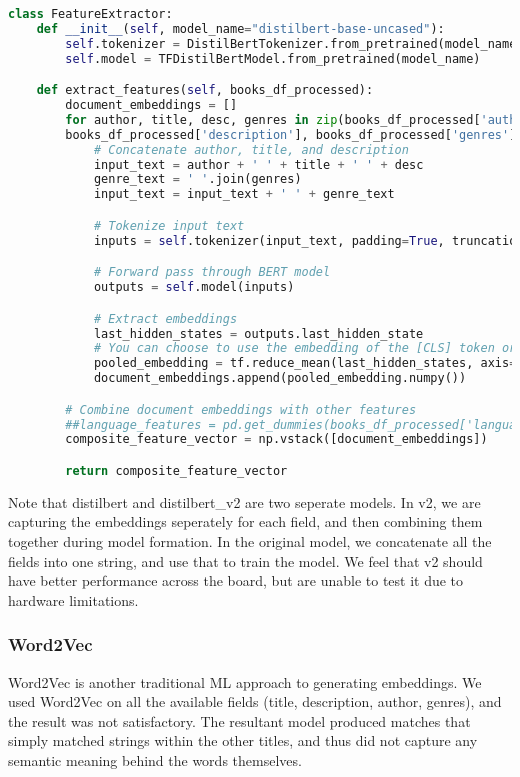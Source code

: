 \begin{lstlisting}[language=Python, caption={Feature Extraction using DistilBert}, label={lst:example}, linewidth=\linewidth, breaklines=true]
    class FeatureExtractor:
    def __init__(self, model_name="distilbert-base-uncased"):
        self.tokenizer = DistilBertTokenizer.from_pretrained(model_name)
        self.model = TFDistilBertModel.from_pretrained(model_name)

    def extract_features(self, books_df_processed):
        document_embeddings = []
        for author, title, desc, genres in zip(books_df_processed['author'], books_df_processed['title'],
        books_df_processed['description'], books_df_processed['genres']):
            # Concatenate author, title, and description
            input_text = author + ' ' + title + ' ' + desc
            genre_text = ' '.join(genres)
            input_text = input_text + ' ' + genre_text

            # Tokenize input text
            inputs = self.tokenizer(input_text, padding=True, truncation=True, return_tensors="tf")

            # Forward pass through BERT model
            outputs = self.model(inputs)

            # Extract embeddings
            last_hidden_states = outputs.last_hidden_state
            # You can choose to use the embedding of the [CLS] token or pool the embeddings to get a single vector
            pooled_embedding = tf.reduce_mean(last_hidden_states, axis=1)
            document_embeddings.append(pooled_embedding.numpy())

        # Combine document embeddings with other features
        ##language_features = pd.get_dummies(books_df_processed['language_code']).values
        composite_feature_vector = np.vstack([document_embeddings])

        return composite_feature_vector
\end{lstlisting}

Note that distilbert and distilbert\_v2 are two seperate models. In v2, we are
capturing the embeddings seperately for each field, and then combining them
together during model formation. In the original model, we concatenate all the
fields into one string, and use that to train the model. We feel that v2 should
have better performance across the board, but are unable to test it due to
hardware limitations.

\subsubsection*{Word2Vec}
Word2Vec is another traditional ML approach to generating embeddings. We used Word2Vec on all the available fields (title, description, author, genres), and the result was not satisfactory. The resultant model produced matches that simply matched strings within the other titles, and thus did not capture any semantic meaning behind the words themselves.

